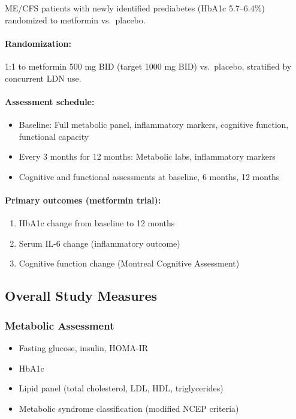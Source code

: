 ME/CFS patients with newly identified prediabetes (HbA1c 5.7--6.4\%) randomized to metformin vs.\ placebo.

\paragraph{Randomization:}
1:1 to metformin 500 mg BID (target 1000 mg BID) vs.\ placebo, stratified by concurrent LDN use.

\paragraph{Assessment schedule:}
\begin{itemize}
    \item Baseline: Full metabolic panel, inflammatory markers, cognitive function, functional capacity
    \item Every 3 months for 12 months: Metabolic labs, inflammatory markers
    \item Cognitive and functional assessments at baseline, 6 months, 12 months
\end{itemize}

\paragraph{Primary outcomes (metformin trial):}
\begin{enumerate}
    \item HbA1c change from baseline to 12 months
    \item Serum IL-6 change (inflammatory outcome)
    \item Cognitive function change (Montreal Cognitive Assessment)
\end{enumerate}

\subsection{Overall Study Measures}

\subsubsection{Metabolic Assessment}
\begin{itemize}
    \item Fasting glucose, insulin, HOMA-IR
    \item HbA1c
    \item Lipid panel (total cholesterol, LDL, HDL, triglycerides)
    \item Metabolic syndrome classification (modified NCEP criteria)
\end{itemize}

